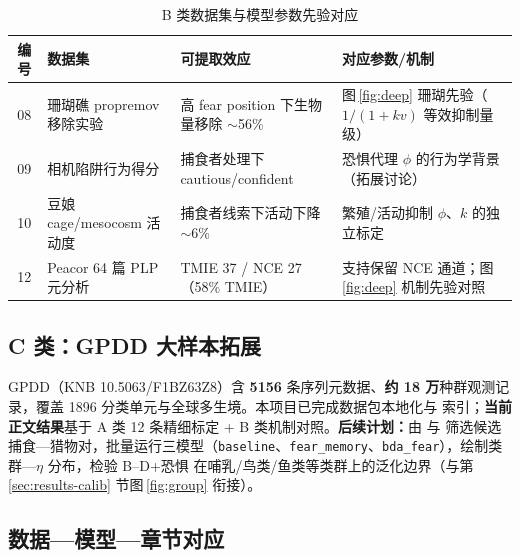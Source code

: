 \documentclass[12pt,a4paper]{ctexart}
\newcommand{\modeltrio}{三模型（\texttt{baseline}、\texttt{fear\_memory}、\texttt{bda\_fear}）}
\begin{document}
\begin{table}[H]
  \centering
  \caption{B 类数据集与模型参数先验对应}
  \label{tab:data-B}
  \footnotesize
  \begin{tabular}{clp{4.2cm}p{4.5cm}}
    \toprule
    编号 & 数据集 & 可提取效应 & 对应参数/机制 \\
    \midrule
    08 & 珊瑚礁 propremov 移除实验 &
    高 fear position 下生物量移除 $\sim$56\% &
    图\,\ref{fig:deep} 珊瑚先验（$1/(1+kv)$ 等效抑制量级） \\
    09 & 相机陷阱行为得分 &
    捕食者处理下 cautious/confident &
    恐惧代理 $\phi$ 的行为学背景（拓展讨论） \\
    10 & 豆娘 cage/mesocosm 活动度 &
    捕食者线索下活动下降 $\sim$6\% &
    繁殖/活动抑制 $\phi$、$k$ 的独立标定 \\
    12 & Peacor 64 篇 PLP 元分析 &
    TMIE 37 / NCE 27（58\% TMIE） &
    支持保留 NCE 通道；图\,\ref{fig:deep} 机制先验对照 \\
    \bottomrule
  \end{tabular}
\end{table}

\subsection{C 类：GPDD 大样本拓展}

GPDD（KNB 10.5063/F1BZ63Z8）含 \textbf{5156} 条序列元数据、\textbf{约 18 万}种群观测记录，覆盖 1896 分类单元与全球多生境。本项目已完成数据包本地化与  索引；\textbf{当前正文结果}基于 A 类 12 条精细标定 + B 类机制对照。\textbf{后续计划：}由  与  筛选候选捕食—猎物对，批量运行\modeltrio{}，绘制类群—$\eta$ 分布，检验 B--D+恐惧 在哺乳/鸟类/鱼类等类群上的泛化边界（与第\,\ref{sec:results-calib} 节图\,\ref{fig:group} 衔接）。

\subsection{数据—模型—章节对应}
\end{document}

